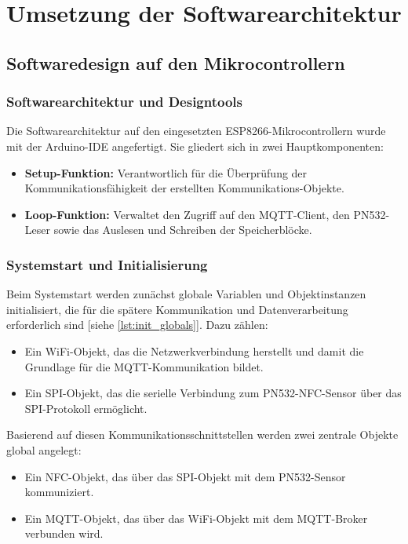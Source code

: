 \chapter{Umsetzung der Softwarearchitektur}
\label{cha:umsetzung}
\section{Softwaredesign auf den Mikrocontrollern}
\label{sec:Node-MCU}

\subsection*{Softwarearchitektur und Designtools}

Die Softwarearchitektur auf den eingesetzten ESP8266-Mikrocontrollern wurde mit der Arduino-IDE angefertigt. Sie gliedert sich in zwei Hauptkomponenten:

\begin{itemize}
	\item \textbf{Setup-Funktion:} Verantwortlich für die Überprüfung der Kommunikationsfähigkeit der erstellten Kommunikations-Objekte.
	\item \textbf{Loop-Funktion:} Verwaltet den Zugriff auf den MQTT-Client, den PN532-Leser sowie das Auslesen und Schreiben der Speicherblöcke.
\end{itemize}


\subsection*{Systemstart und Initialisierung}

Beim Systemstart werden zunächst globale Variablen und Objektinstanzen initialisiert, die für die spätere Kommunikation und Datenverarbeitung erforderlich sind [siehe \autoref{lst:init_globals}]. Dazu zählen:

\begin{itemize}
	\item Ein WiFi-Objekt, das die Netzwerkverbindung herstellt und damit die Grundlage für die MQTT-Kommunikation bildet.
	\item Ein SPI-Objekt, das die serielle Verbindung zum PN532-NFC-Sensor über das SPI-Protokoll ermöglicht.
\end{itemize}

Basierend auf diesen Kommunikationsschnittstellen werden zwei zentrale Objekte global angelegt:

\begin{itemize}
	\item Ein NFC-Objekt, das über das SPI-Objekt mit dem PN532-Sensor kommuniziert.
	\item Ein MQTT-Objekt, das über das WiFi-Objekt mit dem MQTT-Broker verbunden wird.
\end{itemize}

